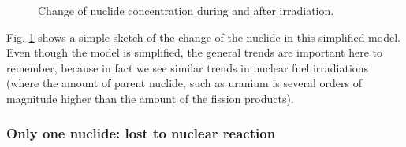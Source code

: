 \begin{figure}[ht!]
\protect {}\protect
\caption{\label{fig:irradiationconc} \footnotesize{Change of nuclide concentration during and after irradiation.}}
\end{figure}

Fig. \ref{fig:irradiationconc} shows a simple sketch of the change of the nuclide in this simplified model. Even though the model is simplified, the general trends are important here to remember, because in fact we see similar trends in nuclear fuel irradiations (where the amount of parent nuclide, such as uranium is several orders of magnitude higher than the amount of the fission products).

\subsubsection*{Only one nuclide: lost to nuclear reaction}


